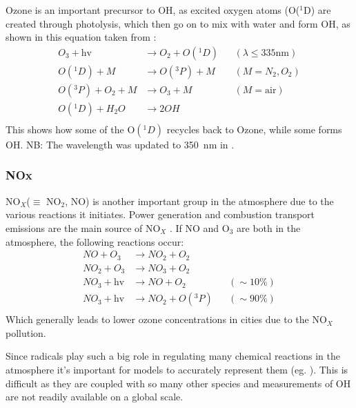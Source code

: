       Ozone is an important precursor to OH, as excited oxygen atoms (O(${}^1$D) are created through photolysis, which then go on to mix with water and form OH, as shown in this equation taken from \cite{Atkinson2000}:
      \begin{equation}
      \begin{aligned}
      O_3 + \text{hv}         & \to  O_2 + O({}^1D)   && (\lambda \le 335 \text{nm}) \\%
      O({}^1D) + M            & \to  O({}^3P) + M     && (M=N_2, O_2)               \\%
      O({}^3P) + O_2 + M      & \to  O_3 + M          && (M=\text{air})             \\%
      O({}^1D) + H_2O         & \to  2OH              &&                            \\%
      \end{aligned}
      \label{LR:Atmos:Chem:eqn_O3toOH}
      \end{equation}
      This shows how some of the O$({}^1D)$ recycles back to Ozone, while some forms OH.
      NB: The wavelength was updated to 350~nm in \cite{AtkinsonArey2003}.
      
    \subsubsection{NOx}
      NO$_X$($\equiv $ NO$_2$, NO) is another important group in the atmosphere due to the various reactions it initiates.
      Power generation and combustion transport emissions are the main source of NO$_X$ .%
      If NO and O$_3$ are both in the atmosphere, the following reactions \citep{Atkinson2000} occur:
      \begin{equation}
      \begin{aligned}
      NO + O_3         & \to NO_2 + O_2      && \\%
      NO_2 + O_3       & \to NO_3 + O_2      && \\%
      NO_3 + \text{hv} & \to NO + O_2        && (\sim 10\%)  \\%
      NO_3 + \text{hv} & \to NO_2 + O({}^3P) && (\sim 90\%)  \\%
      \end{aligned}
      \label{LR:Atmos:Chem:eqn_O3toNO2}
      \end{equation}
      Which generally leads to lower ozone concentrations in cities due to the NO$_X$ pollution.
      
      Since radicals play such a big role in regulating many chemical reactions in the atmosphere it's important for models to accurately represent them (eg. \cite{Travis2014}). 
      This is difficult as they are coupled with so many other species and measurements of OH are not readily available on a global scale.
      
